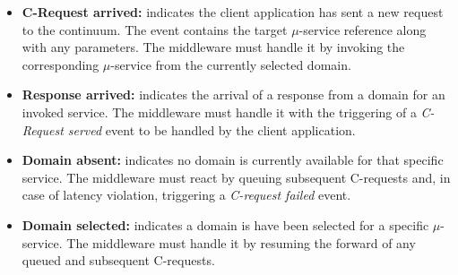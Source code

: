 \begin{itemize}
	
	\item \textbf{C-Request arrived:} indicates the client application has sent a new request to the continuum. The event contains the target $\mu$-service reference along with any parameters. The middleware must handle it by invoking the corresponding $\mu$-service from the currently selected domain.
	
	\item \textbf{Response arrived:} indicates the arrival of a response from a domain for an invoked service. The middleware must handle it with the triggering of a \textit{C-Request served} event to be handled by the client application.
	
	
	\item \textbf{Domain absent:} indicates no domain is currently available for that specific service. The middleware must react by queuing subsequent C-requests and, in case of latency violation, triggering a \textit{C-request failed} event.
	
	\item \textbf{Domain selected:} indicates a domain is have been selected for a specific $\mu$-service. The middleware must handle it by resuming the forward of any queued and subsequent C-requests.
	
\end{itemize}






